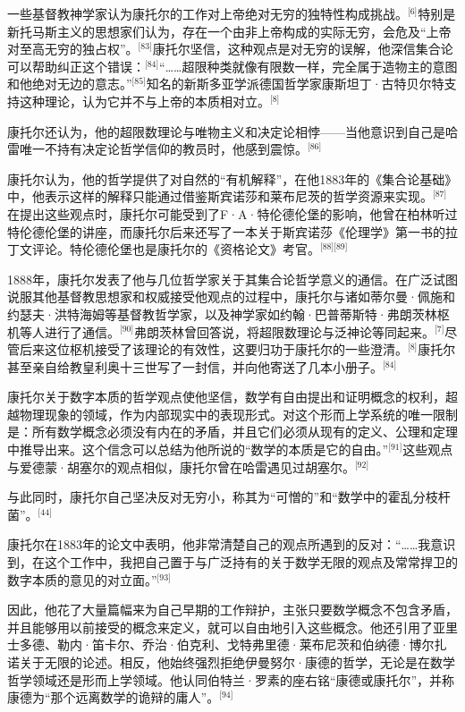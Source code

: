 一些基督教神学家认为康托尔的工作对上帝绝对无穷的独特性构成挑战。\(^\text{[6]}\)特别是新托马斯主义的思想家们认为，存在一个由非上帝构成的实际无穷，会危及“上帝对至高无穷的独占权”。\(^\text{[83]}\)康托尔坚信，这种观点是对无穷的误解，他深信集合论可以帮助纠正这个错误：\(^\text{[84]}\)“……超限种类就像有限数一样，完全属于造物主的意图和他绝对无边的意志。”\(^\text{[85]}\)知名的新斯多亚学派德国哲学家康斯坦丁·古特贝尔特支持这种理论，认为它并不与上帝的本质相对立。\(^\text{[8]}\)

康托尔还认为，他的超限数理论与唯物主义和决定论相悖——当他意识到自己是哈雷唯一不持有决定论哲学信仰的教员时，他感到震惊。\(^\text{[86]}\)

康托尔认为，他的哲学提供了对自然的“有机解释”，在他1883年的《集合论基础》中，他表示这样的解释只能通过借鉴斯宾诺莎和莱布尼茨的哲学资源来实现。\(^\text{[87]}\)在提出这些观点时，康托尔可能受到了F·A·特伦德伦堡的影响，他曾在柏林听过特伦德伦堡的讲座，而康托尔后来还写了一本关于斯宾诺莎《伦理学》第一书的拉丁文评论。特伦德伦堡也是康托尔的《资格论文》考官。\(^\text{[88][89]}\)

1888年，康托尔发表了他与几位哲学家关于其集合论哲学意义的通信。在广泛试图说服其他基督教思想家和权威接受他观点的过程中，康托尔与诸如蒂尔曼·佩施和约瑟夫·洪特海姆等基督教哲学家，以及神学家如约翰·巴普蒂斯特·弗朗茨林枢机等人进行了通信。\(^\text{[90]}\)弗朗茨林曾回答说，将超限数理论与泛神论等同起来。\(^\text{[7]}\)尽管后来这位枢机接受了该理论的有效性，这要归功于康托尔的一些澄清。\(^\text{[8]}\)康托尔甚至亲自给教皇利奥十三世写了一封信，并向他寄送了几本小册子。\(^\text{[84]}\)

康托尔关于数字本质的哲学观点使他坚信，数学有自由提出和证明概念的权利，超越物理现象的领域，作为内部现实中的表现形式。对这个形而上学系统的唯一限制是：所有数学概念必须没有内在的矛盾，并且它们必须从现有的定义、公理和定理中推导出来。这个信念可以总结为他所说的“数学的本质是它的自由。”\(^\text{[91]}\)这些观点与爱德蒙·胡塞尔的观点相似，康托尔曾在哈雷遇见过胡塞尔。\(^\text{[92]}\)

与此同时，康托尔自己坚决反对无穷小，称其为“可憎的”和“数学中的霍乱分枝杆菌”。\(^\text{[44]}\)

康托尔在1883年的论文中表明，他非常清楚自己的观点所遇到的反对：“……我意识到，在这个工作中，我把自己置于与广泛持有的关于数学无限的观点及常常捍卫的数字本质的意见的对立面。”\(^\text{[93]}\)

因此，他花了大量篇幅来为自己早期的工作辩护，主张只要数学概念不包含矛盾，并且能够用以前接受的概念来定义，就可以自由地引入这些概念。他还引用了亚里士多德、勒内·笛卡尔、乔治·伯克利、戈特弗里德·莱布尼茨和伯纳德·博尔扎诺关于无限的论述。相反，他始终强烈拒绝伊曼努尔·康德的哲学，无论是在数学哲学领域还是形而上学领域。他认同伯特兰·罗素的座右铭“康德或康托尔”，并称康德为“那个远离数学的诡辩的庸人”。\(^\text{[94]}\)
